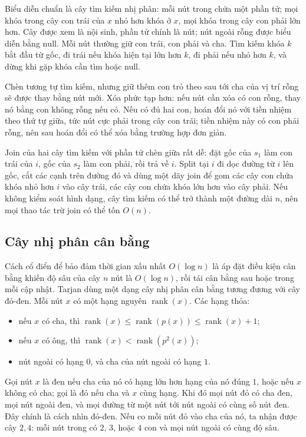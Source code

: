 \documentclass[11pt]{article}
\begin{document}
Biểu diễn chuẩn là cây tìm kiếm nhị phân: mỗi nút trong chứa một phần tử; mọi
khóa trong cây con trái của \(x\) nhỏ hơn khóa ở \(x\), mọi khóa trong cây con
phải lớn hơn. Cây được xem là nội sinh, phần tử chính là nút; nút ngoài rỗng
được biểu diễn bằng \(\text{null}\). Mỗi nút thường giữ con trái, con phải và
cha. Tìm kiếm khóa \(k\) bắt đầu từ gốc, đi trái nếu khóa hiện tại lớn hơn \(k\),
đi phải nếu nhỏ hơn \(k\), và dừng khi gặp khóa cần tìm hoặc null.

Chèn tương tự tìm kiếm, nhưng giữ thêm con trỏ theo sau tới cha của vị trí rỗng
sẽ được thay bằng nút mới. Xóa phức tạp hơn: nếu nút cần xóa có con rỗng, thay
nó bằng con không rỗng nếu có. Nếu có đủ hai con, hoán đổi nó với tiền nhiệm
theo thứ tự giữa, tức nút cực phải trong cây con trái; tiền nhiệm này có con
phải rỗng, nên sau hoán đổi có thể xóa bằng trường hợp đơn giản.

Join của hai cây tìm kiếm với phần tử chèn giữa rất dễ: đặt gốc của \(s_1\) làm
con trái của \(i\), gốc của \(s_2\) làm con phải, rồi trả về \(i\). Split tại
\(i\) đi dọc đường từ \(i\) lên gốc, cắt các cạnh trên đường đó và dùng một dãy
join để gom các cây con chứa khóa nhỏ hơn \(i\) vào cây trái, các cây con chứa
khóa lớn hơn vào cây phải. Nếu không kiểm soát hình dạng, cây tìm kiếm có thể
trở thành một đường dài \(n\), nên mọi thao tác trừ join có thể tốn \(O(n)\).

\subsection*{Cây nhị phân cân bằng}

Cách cổ điển để bảo đảm thời gian xấu nhất \(O(\log n)\) là áp đặt điều kiện
cân bằng khiến độ sâu của cây \(n\) nút là \(O(\log n)\), rồi tái cân bằng sau
hoặc trong mỗi cập nhật. Tarjan dùng một dạng cây nhị phân cân bằng tương đương
với cây đỏ-đen. Mỗi nút \(x\) có một hạng nguyên \(\operatorname{rank}(x)\).
Các hạng thỏa:
\begin{itemize}
  \item nếu \(x\) có cha, thì \(\operatorname{rank}(x)\le
        \operatorname{rank}(p(x))\le \operatorname{rank}(x)+1\);
  \item nếu \(x\) có ông, thì \(\operatorname{rank}(x)<
        \operatorname{rank}(p^2(x))\);
  \item nút ngoài có hạng \(0\), và cha của nút ngoài có hạng \(1\).
\end{itemize}

Gọi nút \(x\) là đen nếu cha của nó có hạng lớn hơn hạng của nó đúng \(1\), hoặc
nếu \(x\) không có cha; gọi là đỏ nếu cha và \(x\) cùng hạng. Khi đó mọi nút đỏ
có cha đen, mọi nút ngoài đen, và mọi đường từ một nút tới nút ngoài có cùng số
nút đen. Đây chính là cách nhìn đỏ-đen. Nếu co mỗi nút đỏ vào cha của nó, ta
nhận được cây \(2,4\): mỗi nút trong có \(2\), \(3\), hoặc \(4\) con và mọi nút
ngoài có cùng độ sâu.
\end{document}
